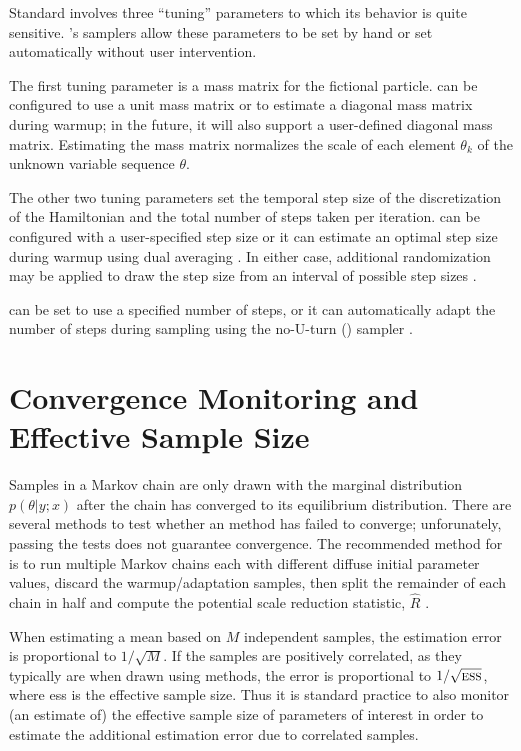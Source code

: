 Standard \HMC involves three ``tuning'' parameters to which its
behavior is quite sensitive.  \Stan's samplers allow these parameters
to be set by hand or set automatically without user intervention.

The first tuning parameter is a mass matrix for the fictional
particle.  \Stan can be configured to use a unit mass matrix or to
estimate a diagonal mass matrix during warmup; in the future, it will
also support a user-defined diagonal mass matrix.  Estimating the mass
matrix normalizes the scale of each element $\theta_k$ of the unknown
variable sequence $\theta$.

The other two tuning parameters set the temporal step size of the
discretization of the Hamiltonian and the total number of steps taken
per iteration.  \Stan can be configured with a user-specified step
size or it can estimate an optimal step size during warmup using dual
averaging \citep{Nesterov:2009, Hoffman-Gelman:2012}.  In either case, additional
randomization may be applied to draw the step size from an interval of
possible step sizes \citep{Neal:2011}.

\Stan can be set to use a specified number of steps, or it can
automatically adapt the number of steps during sampling using the
no-U-turn (\NUTS) sampler \citep{Hoffman-Gelman:2012}.  


\section{Convergence Monitoring and Effective Sample Size}

Samples in a Markov chain are only drawn with the marginal
distribution $p(\theta|y;x)$ after the chain has converged to its
equilibrium distribution.  There are several methods to test whether
an \MCMC method has failed to converge; unforunately, passing the
tests does not guarantee convergence.  The recommended method for
\Stan is to run multiple Markov chains each with different diffuse
initial parameter values, discard the warmup/adaptation samples, then
split the remainder of each chain in half and compute the potential
scale reduction statistic, $\hat{R}$ \citep{GelmanRubin:1992}.

When estimating a mean based on $M$ independent samples, the
estimation error is proportional to $1/\sqrt{M}$.  If the samples are
positively correlated, as they typically are when drawn using \MCMC
methods, the error is proportional to $1/\sqrt{\mbox{\sc ess}}$, where
{\sc ess} is the effective sample size.  Thus it is standard practice
to also monitor (an estimate of) the effective sample size of
parameters of interest in order to estimate the additional estimation
error due to correlated samples.





